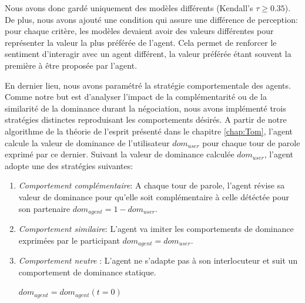 Nous avons donc gardé uniquement des modèles différents (Kendall's  $ \tau \geq 0.35$). De plus, nous avons ajouté une condition qui assure une différence de perception: pour chaque critère, les modèles devaient avoir des valeurs différentes pour représenter la valeur la plus préférée de l'agent. 
Cela permet de renforcer le sentiment d'interagir avec un agent différent, la valeur préférée étant souvent la première à être proposée par l'agent. 

En dernier lieu, nous avons paramétré la stratégie comportementale des agents. Comme notre but est d'analyser l'impact de la complémentarité ou de la similarité de la dominance durant la négociation, nous avons implémenté trois stratégies distinctes reproduisant les comportements désirés. 
A partir de notre algorithme de la théorie de l'esprit présenté dans le chapitre \ref{chap:Tom}, l'agent calcule la valeur de dominance de l'utilisateur $dom_{user}$ pour chaque tour de parole exprimé par ce dernier. Suivant la valeur de dominance calculée $dom_{user}$, l'agent adopte une des stratégies suivantes:



\begin{enumerate}
	\item \textit{Comportement complémentaire}: A chaque tour de parole, l'agent révise sa valeur de dominance pour qu'elle soit complémentaire à celle détéctée pour son partenaire $dom_{agent}=1-dom_{user}$.
	
	\item \textit{Comportement similaire}: L'agent va imiter les comportements de dominance exprimées par le participant $dom_{agent} = dom_{user}$.
	
	\item \textit{Comportement neutre} : L'agent ne s'adapte pas à son interlocuteur et suit un comportement de dominance statique.
	
	 $dom_{agent} = dom_{agent} (t=0)$
\end{enumerate}

